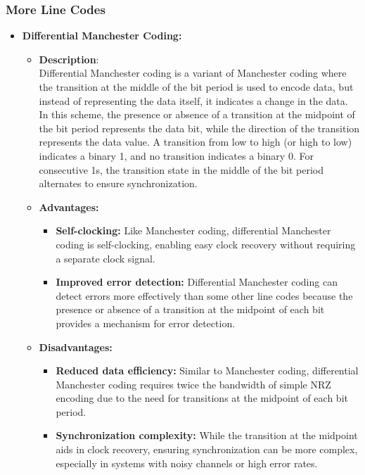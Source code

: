 \documentclass[a4paper, 12pt, english]{article}
\begin{document}
\subsubsection{More Line Codes}
\begin{itemize}
    \item \textbf{Differential Manchester Coding:}
        \begin{itemize}
            \item \textbf{Description}: \\
            Differential Manchester coding is a variant of Manchester coding where the transition at the middle of the bit period is used to encode data, but instead of representing the data itself, it indicates a change in the data. In this scheme, the presence or absence of a transition at the midpoint of the bit period represents the data bit, while the direction of the transition represents the data value.
            A transition from low to high (or high to low) indicates a binary 1, and no transition indicates a binary 0.
            For consecutive 1s, the transition state in the middle of the bit period alternates to ensure synchronization.
            \item \textbf{Advantages:}
                \begin{itemize}
                    \item \textbf{Self-clocking:} Like Manchester coding, differential Manchester coding is self-clocking, enabling easy clock recovery without requiring a separate clock signal.
                    \item \textbf{Improved error detection:} Differential Manchester coding can detect errors more effectively than some other line codes because the presence or absence of a transition at the midpoint of each bit provides a mechanism for error detection.
                \end{itemize}
            \item \textbf{Disadvantages:}
                \begin{itemize}
                    \item \textbf{Reduced data efficiency:} Similar to Manchester coding, differential Manchester coding requires twice the bandwidth of simple NRZ encoding due to the need for transitions at the midpoint of each bit period.
                    \item \textbf{Synchronization complexity:} While the transition at the midpoint aids in clock recovery, ensuring synchronization can be more complex, especially in systems with noisy channels or high error rates.
                \end{itemize}
        \end{itemize}


\end{itemize}
\end{document}
